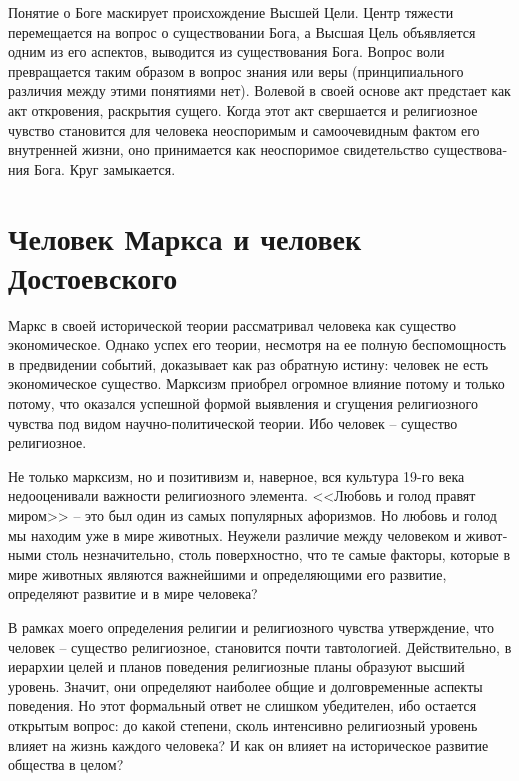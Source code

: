\documentclass{book}
\begin{document}
Понятие о Боге маскирует происхождение Высшей Цели. Центр тяжести перемещается на вопрос о существовании  Бога, а Высшая Цель объявляется одним из его аспектов, выводится из существования Бога. Вопрос воли  превращается таким обра­зом в вопрос знания  или веры  (принципиального различия между этими понятиями нет). Волевой в своей основе акт предстает как акт откровения, раскрытия сущего. Когда этот акт свершается и религиозное чувство становится для человека неоспоримым и самоочевидным фактом его внутренней жизни, оно принимается как неоспоримое свидетельство существова­ния Бога. Круг замыкается. 


\section{Человек Маркса и человек Достоевского}

Маркс в своей исторической теории рассматривал человека как существо экономическое.  Однако успех его теории, несмот­ря на ее полную беспомощность в предвидении событий, дока­зывает как раз обратную истину: человек не есть экономиче­ское существо. Марксизм приобрел огромное влияние потому и только потому, что оказался успешной формой выявления и сгущения религиозного чувства под видом научно-политической теории. Ибо человек -- существо религиозное.

Не только марксизм, но и позитивизм и, наверное, вся куль­тура 19-го века недооценивали важности религиозного элемен­та. <<Любовь и голод правят миром>> -- это был один из самых популярных афоризмов. Но любовь и голод мы находим уже в мире животных. Неужели различие между человеком и живот­ными столь незначительно, столь поверхностно, что те самые факторы, которые в мире животных являются важнейшими и определяющими его развитие, определяют развитие и в мире человека?

В рамках моего определения религии и религиозного чувст­ва утверждение, что человек -- существо религиозное, становит­ся почти тавтологией. Действительно, в иерархии целей и планов поведения религиозные планы образуют высший уровень. Зна­чит, они определяют наиболее общие и долговременные аспек­ты поведения. Но этот формальный ответ не слишком убеди­телен, ибо остается открытым вопрос: до какой степени, сколь интенсивно религиозный уровень влияет на жизнь каждого человека? И как он влияет на историческое развитие общест­ва в целом?
\end{document}
